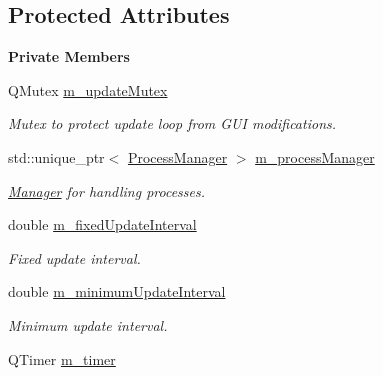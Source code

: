 \subsection*{Protected Attributes}
\begin{Indent}\textbf{ Private Members}\par
\begin{DoxyCompactItemize}
\item 
\mbox{\label{classrev_1_1_simulation_loop_a3b79f1ddf2e13eede925d3c893d00c87}} 
Q\+Mutex \mbox{\hyperlink{classrev_1_1_simulation_loop_a3b79f1ddf2e13eede925d3c893d00c87}{m\+\_\+update\+Mutex}}
\begin{DoxyCompactList}\small\item\em Mutex to protect update loop from G\+UI modifications. \end{DoxyCompactList}\item 
\mbox{\label{classrev_1_1_simulation_loop_aeb03cda745291f89f2737edcb911c94c}} 
std\+::unique\+\_\+ptr$<$ \mbox{\hyperlink{classrev_1_1_process_manager}{Process\+Manager}} $>$ \mbox{\hyperlink{classrev_1_1_simulation_loop_aeb03cda745291f89f2737edcb911c94c}{m\+\_\+process\+Manager}}
\begin{DoxyCompactList}\small\item\em \mbox{\hyperlink{classrev_1_1_manager}{Manager}} for handling processes. \end{DoxyCompactList}\item 
double \mbox{\hyperlink{classrev_1_1_simulation_loop_a3d754a1b34a79f17e9245a9d04442ff8}{m\+\_\+fixed\+Update\+Interval}}
\begin{DoxyCompactList}\small\item\em Fixed update interval. \end{DoxyCompactList}\item 
double \mbox{\hyperlink{classrev_1_1_simulation_loop_aa74c432b0fd79e8d5b74c320fcae3906}{m\+\_\+minimum\+Update\+Interval}}
\begin{DoxyCompactList}\small\item\em Minimum update interval. \end{DoxyCompactList}\item 
\mbox{\label{classrev_1_1_simulation_loop_a2212997700aeff7dbb94908b83ada68f}} 
Q\+Timer \mbox{\hyperlink{classrev_1_1_simulation_loop_a2212997700aeff7dbb94908b83ada68f}{m\+\_\+timer}}

\end{DoxyCompactItemize}
\end{Indent}
